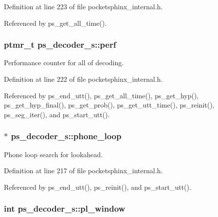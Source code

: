 Definition at line 223 of file pocketsphinx\+\_\+internal.\+h.



Referenced by ps\+\_\+get\+\_\+all\+\_\+time().

\subsubsection[{perf}]{\setlength{\rightskip}{0pt plus 5cm}ptmr\+\_\+t ps\+\_\+decoder\+\_\+s\+::perf}\label{structps__decoder__s_ab42d1d1e300d2a6df5dd3cd796a27d43}


Performance counter for all of decoding. 



Definition at line 222 of file pocketsphinx\+\_\+internal.\+h.



Referenced by ps\+\_\+end\+\_\+utt(), ps\+\_\+get\+\_\+all\+\_\+time(), ps\+\_\+get\+\_\+hyp(), ps\+\_\+get\+\_\+hyp\+\_\+final(), ps\+\_\+get\+\_\+prob(), ps\+\_\+get\+\_\+utt\+\_\+time(), ps\+\_\+reinit(), ps\+\_\+seg\+\_\+iter(), and ps\+\_\+start\+\_\+utt().

\subsubsection[{phone\+\_\+loop}]{$\ast$ ps\+\_\+decoder\+\_\+s\+::phone\+\_\+loop}\label{structps__decoder__s_a0c6d141d7a71a1287be00a1ebcc7643d}


Phone loop search for lookahead. 



Definition at line 217 of file pocketsphinx\+\_\+internal.\+h.



Referenced by ps\+\_\+end\+\_\+utt(), ps\+\_\+reinit(), and ps\+\_\+start\+\_\+utt().

\subsubsection[{pl\+\_\+window}]{\setlength{\rightskip}{0pt plus 5cm}int ps\+\_\+decoder\+\_\+s\+::pl\+\_\+window}\label{structps__decoder__s_a0f0a6681ffd98af789f6bed556c814e4}


